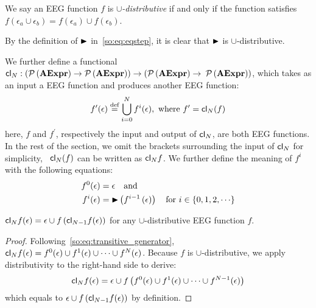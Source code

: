 \begin{definition}
    We say an EEG function $f$ is \emph{$\cup$-distributive} if and only if
    the function satisfies $f(\epsilon_a \cup \epsilon_b) = f(\epsilon_a) \cup
    f(\epsilon_b)$.
\end{definition}
\begin{corollary}
    By the definition of $\operatorname{\blacktriangleright}$ in~\eqref{so:eq:eqstep}, it is clear that
    $\operatorname{\blacktriangleright}$ is $\cup$-distributive.
    {}\label{so:cor:union}
\end{corollary}

\renewcommand{\closure}{\ensuremath\mathsf{cl}}

We further define a functional $\closure_N: ( \powersetof\aexprset \to
\powersetof\aexprset ) \to ( \powersetof\aexprset \to$ $\mathcal{P}\left({\mathbf{AExpr}}\right)
)$, which takes as an input a EEG function and produces another EEG function:
\begin{equation}
    f^\prime (\epsilon) \stackrel{\text{def}}=
        \bigcup_{i = 0}^N f^i(\epsilon),
    \text{~where~} f^\prime = \closure_N (f)
    \label{so:eq:transitive_generator}
\end{equation}
here, $f$ and $f^\prime$, respectively the input and output of $\closure_N$,
are both EEG functions.  In the rest of the section, we omit the brackets
surrounding the input of $\closure_N$ for simplicity, \eg~$\closure_N (f)$ can
be written as $\closure_N f$.  We further define the meaning of $f^i$ with the
following equations:
\begin{equation}
    \begin{aligned}
        f^0(\epsilon) &= \epsilon \quad \text{and~} \\
        f^i(\epsilon) &= \operatorname{\blacktriangleright}\left(
            f^{i - 1}\left(\epsilon\right)
        \right) \quad \text{for~} i \in \{ 0, 1, 2, \cdots \}
    \end{aligned}
\end{equation}

\begin{lemma}
    $\closure_N f(\epsilon) = \epsilon \cup f \left( \closure_{N-1} f(\epsilon)
    \right)$ for any $\cup$-distributive EEG function $f$.
    {}\label{so:lem:transitive}
\end{lemma}
\begin{proof}
    Following~\eqref{so:eq:transitive_generator}, $\closure_N f(\epsilon) =
    f^0(\epsilon) \cup f^1(\epsilon) \cup \cdots \cup f^N(\epsilon)$.  Because
    $f$ is $\cup$-distributive, we apply distributivity to the right-hand side
    to derive:
    \begin{equation}
        \closure_N f(\epsilon) = \epsilon \cup f\left(
            f^0(\epsilon) \cup f^1(\epsilon) \cup \cdots \cup f^{N-1}(\epsilon)
        \right)
    \end{equation}
    which equals to $\epsilon \cup f\left( \closure_{N-1} f(\epsilon) \right)$
    by definition.
\end{proof}


